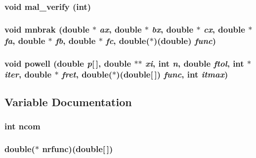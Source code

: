\subsubsection{\setlength{\rightskip}{0pt plus 5cm}void mal\_\-verify (int)}\label{nrminmd_8c_87051351b4758adbcfc4c35051e76ad4}


\subsubsection{\setlength{\rightskip}{0pt plus 5cm}void mnbrak (double $\ast$ {\em ax}, double $\ast$ {\em bx}, double $\ast$ {\em cx}, double $\ast$ {\em fa}, double $\ast$ {\em fb}, double $\ast$ {\em fc}, double($\ast$)(double) {\em func})}\label{nrminmd_8c_ae863d3c940914dec464bad3f8c74e30}


\subsubsection{\setlength{\rightskip}{0pt plus 5cm}void powell (double {\em p}[$\,$], double $\ast$$\ast$ {\em xi}, int {\em n}, double {\em ftol}, int $\ast$ {\em iter}, double $\ast$ {\em fret}, double($\ast$)(double[$\,$]) {\em func}, int {\em itmax})}\label{nrminmd_8c_b5bbed773331f96a7c35ddd95eb380a2}




\subsection{Variable Documentation}
\subsubsection{\setlength{\rightskip}{0pt plus 5cm}int {\bf ncom}\hspace{0.3cm}{\tt  [static]}}\label{nrminmd_8c_30236c67e1f0e59ef05fe357a8bbf6f0}


\subsubsection{\setlength{\rightskip}{0pt plus 5cm}double($\ast$ {\bf nrfunc})(double[$\,$])\hspace{0.3cm}{\tt  [static]}}\label{nrminmd_8c_6420a7b7ce8471bdaee783b2fc2ae5f0}


